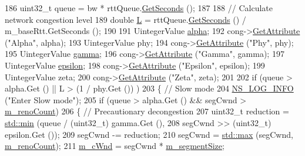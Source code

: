 \begin{DoxyCode}
186           uint32\_t queue = bw * rttQueue.\hyperlink{classns3_1_1Time_a8f20d5c3b0902d7b4320982f340b57c8}{GetSeconds} ();
187 
188           \textcolor{comment}{// Calculate network congestion level}
189           \textcolor{keywordtype}{double} \hyperlink{loss__ITU1411__NLOS__over__rooftop_8m_a0f93e2c2e7c447b4dfc5bcac7e346da1}{L} = rttQueue.\hyperlink{classns3_1_1Time_a8f20d5c3b0902d7b4320982f340b57c8}{GetSeconds} () / m\_baseRtt.GetSeconds ();
190 
191           UintegerValue \hyperlink{lte__uplink__power__control_8m_a62197192f0fbf4e0675eb37be1c4c175}{alpha};
192           cong->\hyperlink{classns3_1_1ObjectBase_a895d1de2f96063d0e0fd78463e7a7e30}{GetAttribute} (\textcolor{stringliteral}{"Alpha"}, alpha);
193           UintegerValue phy;
194           cong->\hyperlink{classns3_1_1ObjectBase_a895d1de2f96063d0e0fd78463e7a7e30}{GetAttribute} (\textcolor{stringliteral}{"Phy"}, phy);
195           UintegerValue \hyperlink{lte__amc_8m_a8d00631c9622112f1877fdb1222c242e}{gamma};
196           cong->\hyperlink{classns3_1_1ObjectBase_a895d1de2f96063d0e0fd78463e7a7e30}{GetAttribute} (\textcolor{stringliteral}{"Gamma"}, gamma);
197           UintegerValue \hyperlink{tv-spectrum-transmitter-test_8cc_a4904cc82627458fdf6672ccc0b2802c7}{epsilon};
198           cong->\hyperlink{classns3_1_1ObjectBase_a895d1de2f96063d0e0fd78463e7a7e30}{GetAttribute} (\textcolor{stringliteral}{"Epsilon"}, epsilon);
199           UintegerValue zeta;
200           cong->\hyperlink{classns3_1_1ObjectBase_a895d1de2f96063d0e0fd78463e7a7e30}{GetAttribute} (\textcolor{stringliteral}{"Zeta"}, zeta);
201 
202           \textcolor{keywordflow}{if} (queue > alpha.Get () || L > (1 / phy.Get ()) )
203             \{ \textcolor{comment}{// Slow mode}
204               \hyperlink{group__logging_gafbd73ee2cf9f26b319f49086d8e860fb}{NS\_LOG\_INFO} (\textcolor{stringliteral}{"Enter Slow mode"});
205               \textcolor{keywordflow}{if} (queue > alpha.Get () && segCwnd > \hyperlink{classTcpYeahIncrementTest_abef7ecc57097eb21573a3efdd133229c}{m\_renoCount})
206                 \{ \textcolor{comment}{// Precautionary decongestion}
207                   uint32\_t reduction = \hyperlink{80211b_8c_ac6afabdc09a49a433ee19d8a9486056d}{std::min} (queue / (uint32\_t) gamma.Get (),
208                                         segCwnd >> (uint32\_t) epsilon.Get ());
209                   segCwnd -= reduction;
210                   segCwnd = \hyperlink{80211b_8c_affe776513b24d84b39af8ab0930fef7f}{std::max} (segCwnd, \hyperlink{classTcpYeahIncrementTest_abef7ecc57097eb21573a3efdd133229c}{m\_renoCount});
211                   \hyperlink{classTcpYeahIncrementTest_a3661dc763cb1315b447146422578f251}{m\_cWnd} = segCwnd * \hyperlink{classTcpYeahIncrementTest_a6b999589e0dd543d73c2a47f0a1dcaf7}{m\_segmentSize};

\end{DoxyCode}
